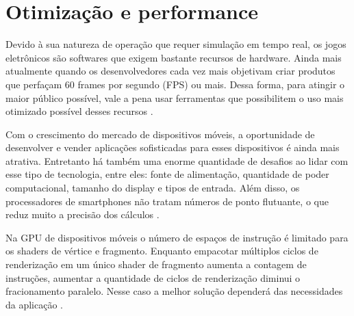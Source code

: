 \begin{figure}[h!]
	\centering
\end{figure}
\nocite{materialUnreal}

\section{Otimização e performance}
\label{sec:otimizacao-performance}

Devido à sua natureza de operação que requer simulação em tempo real, os jogos eletrônicos são softwares que exigem bastante recursos de hardware. Ainda mais atualmente quando os desenvolvedores cada vez mais objetivam criar produtos que perfaçam 60 frames por segundo (FPS) ou mais. Dessa forma, para atingir o maior público possível, vale a pena usar ferramentas que possibilitem o uso mais otimizado possível desses recursos \cite{comparacaoDesempenho}.

Com o crescimento do mercado de dispositivos móveis, a oportunidade de desenvolver e vender aplicações sofisticadas para esses dispositivos é ainda mais atrativa. Entretanto há também uma enorme quantidade de desafios ao lidar com esse tipo de tecnologia, entre eles: fonte de alimentação, quantidade de poder computacional, tamanho do display e tipos de entrada. Além disso, os processadores de smartphones não tratam números de ponto flutuante, o que reduz muito a precisão dos cálculos \cite{optimizationMobile}.

Na GPU de dispositivos móveis o número de espaços de instrução é limitado para os shaders de vértice e fragmento. Enquanto empacotar múltiplos ciclos de renderização em um único shader de fragmento aumenta a contagem de instruções, aumentar a quantidade de ciclos de renderização diminui o fracionamento paralelo. Nesse caso a melhor solução dependerá das necessidades da aplicação \cite{designMobileGPU}. 

